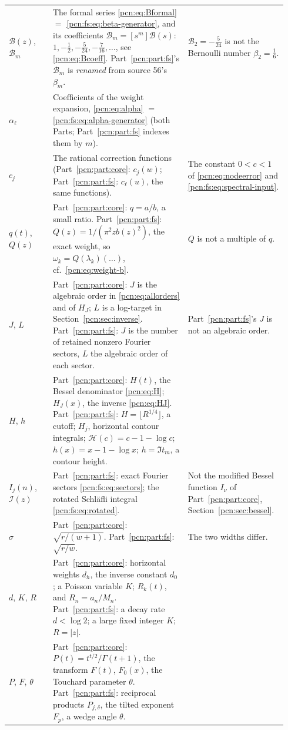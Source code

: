 \documentclass[11pt,letterpaper]{article}
\theoremstyle{remark}\newtheorem{remark}[theorem]{Remark}
\begin{document}
{\begin{longtable}{@{}>{\raggedright\arraybackslash}p{0.15\linewidth}>{\raggedright\arraybackslash}p{0.46\linewidth}>{\raggedright\arraybackslash}p{0.33\linewidth}@{}}
$\mathcal B(z)$, $\mathcal B_m$ & The formal series \eqref{pcn:eq:Bformal} $=$ \eqref{pcn:fs:eq:beta-generator}, and its coefficients $\mathcal B_m=[s^m]\mathcal B(s)$: $1,-\frac12,-\frac5{24},-\frac7{16},\ldots$, see \eqref{pcn:eq:Bcoeff}. Part~\ref{pcn:part:fs}'s $\mathcal B_m$ is \emph{renamed} from source 56's $\beta_m$. & $\mathcal B_2=-\frac5{24}$ is not the Bernoulli number $\beta_2=\frac16$.\\
$\alpha_\ell$ & Coefficients of the weight expansion, \eqref{pcn:eq:alpha} $=$ \eqref{pcn:fs:eq:alpha-generator} (both Parts; Part~\ref{pcn:part:fs} indexes them by $m$). & \\
$c_j$ & The rational correction functions (Part~\ref{pcn:part:core}: $c_j(w)$; Part~\ref{pcn:part:fs}: $c_\ell(u)$, the same functions). & The constant $0<c<1$ of \eqref{pcn:eq:nodeerror} and \eqref{pcn:fs:eq:spectral-input}.\\
$q(t)$, $Q(z)$ & Part~\ref{pcn:part:core}: $q=a/b$, a small ratio. Part~\ref{pcn:part:fs}: $Q(z)=1/(\pi^2zb(z)^2)$, the exact weight, so $\omega_k=Q(\lambda_k)(\ldots)$, cf.\ \eqref{pcn:eq:weight-b}. & $Q$ is not a multiple of $q$.\\
$J$, $L$ & Part~\ref{pcn:part:core}: $J$ is the algebraic order in \eqref{pcn:eq:allorders} and of $H_J$; $L$ is a log-target in Section~\ref{pcn:sec:inverse}. Part~\ref{pcn:part:fs}: $J$ is the number of retained nonzero Fourier sectors, $L$ the algebraic order of each sector. & Part~\ref{pcn:part:fs}'s $J$ is not an algebraic order.\\
$H$, $h$ & Part~\ref{pcn:part:core}: $H(t)$, the Bessel denominator \eqref{pcn:eq:H}; $H_J(x)$, the inverse \eqref{pcn:eq:HJ}. Part~\ref{pcn:part:fs}: $H=\lfloor R^{1/4}\rfloor$, a cutoff; $H_j$, horizontal contour integrals; $\mathcal H(c)=c-1-\log c$; $h(x)=x-1-\log x$; $h=\Im t_m$, a contour height. & \\
$I_j(n)$, $\mathcal I(z)$ & Part~\ref{pcn:part:fs}: exact Fourier sectors \eqref{pcn:fs:eq:sectors}; the rotated Schl\"afli integral \eqref{pcn:fs:eq:rotated}. & Not the modified Bessel function $I_\nu$ of Part~\ref{pcn:part:core}, Section~\ref{pcn:sec:bessel}.\\
$\sigma$ & Part~\ref{pcn:part:core}: $\sqrt{r/(w+1)}$. Part~\ref{pcn:part:fs}: $\sqrt{r/w}$. & The two widths differ.\\
$d$, $K$, $R$ & Part~\ref{pcn:part:core}: horizontal weights $d_h$, the inverse constant $d_0$; a Poisson variable $K$; $R_k(t)$, and $R_n=a_n/M_n$. Part~\ref{pcn:part:fs}: a decay rate $d<\log2$; a large fixed integer $K$; $R=|z|$. & \\
$P$, $F$, $\theta$ & Part~\ref{pcn:part:core}: $P(t)=t^{t/2}/\Gamma(t+1)$, the transform $F(t)$, $F_0(x)$, the Touchard parameter $\theta$. Part~\ref{pcn:part:fs}: reciprocal products $P_{j,\delta}$, the tilted exponent $F_p$, a wedge angle $\theta$. & \\
\end{longtable}
}
\end{document}
